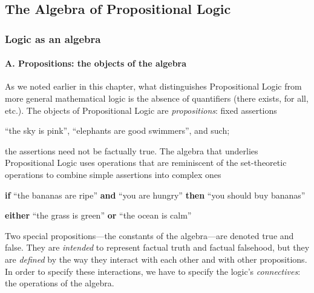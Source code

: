 \subsection{The Algebra of Propositional Logic}
\label{sec:Propositional-logic}

\subsubsection{Logic as an algebra}

\paragraph{A. Propositions: the objects of the algebra}

\noindent
As we noted earlier in this chapter, what distinguishes Propositional
Logic from more general mathematical logic is the absence of
quantifiers ({\sc there exists}, {\sc for all}, etc.).  The objects of
Propositional Logic are {\it propositions}: fixed assertions

\smallskip

``the sky is pink'', ``elephants are good swimmers'', and such;

\smallskip

\noindent 
the assertions need not be factually true.  The algebra that underlies
Propositional Logic uses operations that are reminiscent of the
set-theoretic operations to combine simple assertions into complex
ones

\smallskip

{\bf if} ``the bananas are ripe'' {\bf and} ``you are hungry'' {\bf then}
 ``you should buy bananas''

\smallskip

{\bf either} ``the grass is green'' {\bf or} ``the ocean is calm''

\smallskip

\noindent
Two special propositions---the constants of the algebra---are denoted
{\sc true} and {\sc false}.  They are {\em intended} to represent factual
truth and factual falsehood, but they are {\em defined} by the way
they interact with each other and with other propositions.  In order
to specify these interactions, we have to specify the logic's {\it
  connectives}: the operations of the algebra.

\bigskip

